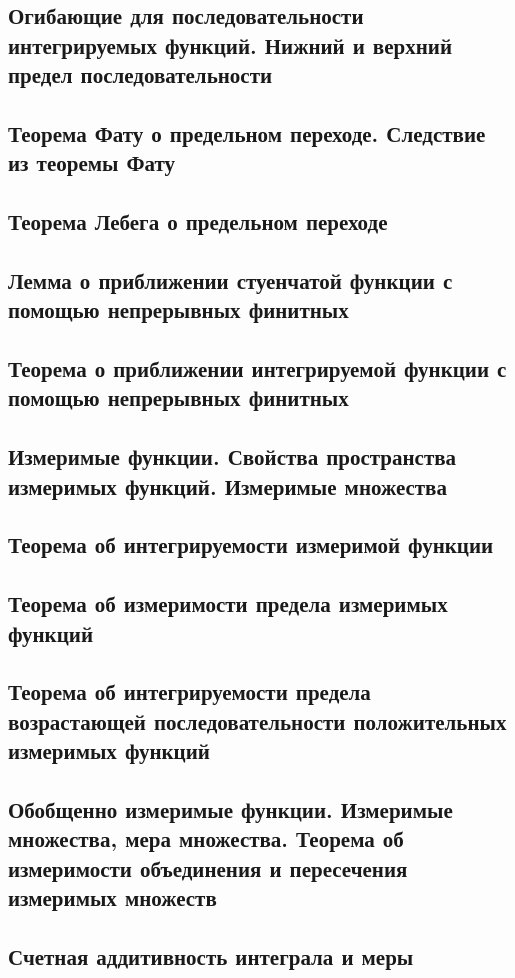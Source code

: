 \documentclass[a4paper]{article}
\theoremstyle{definition}
\theoremstyle{remark}
\begin{document}
    \subsection{ Огибающие для последовательности интегрируемых функций. Нижний и верхний предел последовательности}

    \subsection{ Теорема Фату о предельном переходе. Следствие из теоремы Фату}
    \subsection{ Теорема Лебега о предельном переходе}
    \subsection{ Лемма о приближении стуенчатой функции с помощью непрерывных финитных}
    \subsection{ Теорема о приближении интегрируемой функции с помощью непрерывных финитных}
    \subsection{ Измеримые функции. Свойства пространства измеримых функций. Измеримые множества}
    \subsection{ Теорема об интегрируемости измеримой функции}
    \subsection{ Теорема об измеримости предела измеримых функций}
    \subsection{ Теорема об интегрируемости предела возрастающей
    последовательности положительных измеримых функций}
    \subsection{ Обобщенно измеримые функции. Измеримые множества, мера множества. Теорема об измеримости объединения и пересечения измеримых множеств}
    \subsection{ Счетная аддитивность интеграла и меры}
\end{document}
